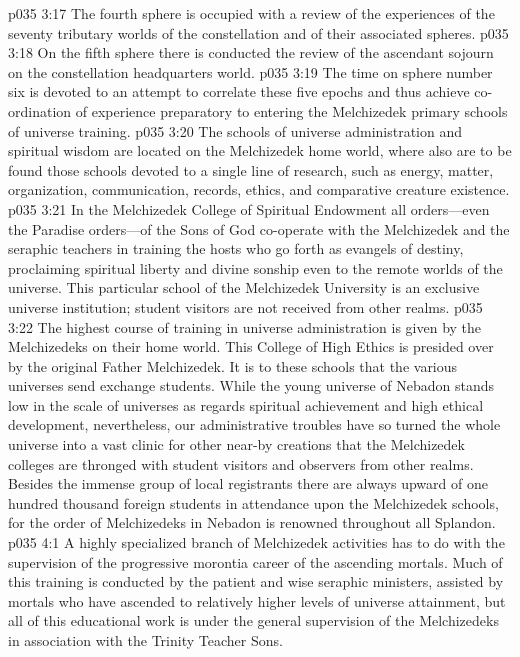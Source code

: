 \pc \vs p035 3:17 \bibnobreakspace The fourth sphere is occupied with a review of the experiences of the seventy tributary worlds of the constellation and of their associated spheres.
\pc \vs p035 3:18 \bibnobreakspace On the fifth sphere there is conducted the review of the ascendant sojourn on the constellation headquarters world.
\pc \vs p035 3:19 \bibnobreakspace The time on sphere number six is devoted to an attempt to correlate these five epochs and thus achieve co\hyp{}ordination of experience preparatory to entering the Melchizedek primary schools of universe training.\plusone
\pc \vs p035 3:20 The schools of universe administration and spiritual wisdom are located on the Melchizedek home world, where also are to be found those schools devoted to a single line of research, such as energy, matter, organization, communication, records, ethics, and comparative creature existence.
\vs p035 3:21 In the Melchizedek College of Spiritual Endowment all orders---even the Paradise orders---of the Sons of God co\hyp{}operate with the Melchizedek and the seraphic teachers in training the hosts who go forth as evangels of destiny, proclaiming spiritual liberty and divine sonship even to the remote worlds of the universe. This particular school of the Melchizedek University is an exclusive universe institution; student visitors are not received from other realms.
\vs p035 3:22 The highest course of training in universe administration is given by the Melchizedeks on their home world. This College of High Ethics is presided over by the original Father Melchizedek. It is to these schools that the various universes send exchange students. While the young universe of Nebadon stands low in the scale of universes as regards spiritual achievement and high ethical development, nevertheless, our administrative troubles have so turned the whole universe into a vast clinic for other near\hyp{}by creations that the Melchizedek colleges are thronged with student visitors and observers from other realms. Besides the immense group of local registrants there are always upward of one hundred thousand foreign students in attendance upon the Melchizedek schools, for the order of Melchizedeks in Nebadon is renowned throughout all Splandon.
\vs p035 4:1 A highly specialized branch of Melchizedek activities has to do with the supervision of the progressive morontia career of the ascending mortals. Much of this training is conducted by the patient and wise seraphic ministers, assisted by mortals who have ascended to relatively higher levels of universe attainment, but all of this educational work is under the general supervision of the Melchizedeks in association with the Trinity Teacher Sons.
